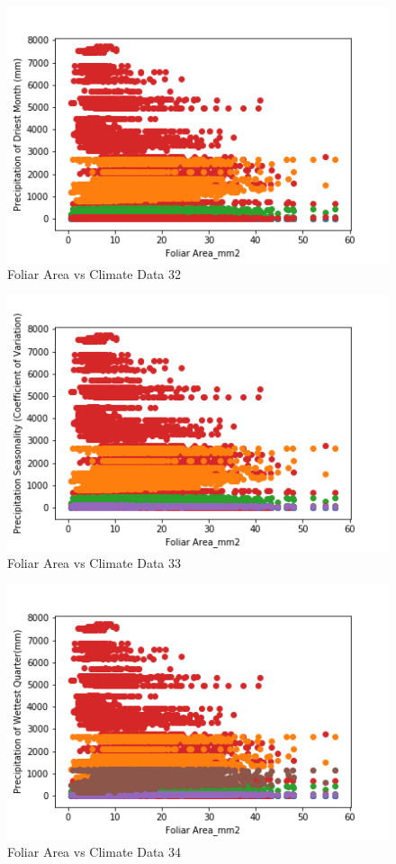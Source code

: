 \documentclass[letterpaper]{article}
\begin{document}
\begin{figure}[h]
\caption{Foliar Area vs Climate Data 32\label{fig:Foliar_Area_vs_32}}
\centering
\includegraphics[width=0.7\paperwidth]{Foliar_Area_vs_32}
\end{figure}


\begin{figure}[h]
\caption{Foliar Area vs Climate Data 33\label{fig:Foliar_Area_vs_33}}
\centering
\includegraphics[width=0.7\paperwidth]{Foliar_Area_vs_33}
\end{figure}


\begin{figure}[h]
\caption{Foliar Area vs Climate Data 34\label{fig:Foliar_Area_vs_34}}
\centering
\includegraphics[width=0.7\paperwidth]{Foliar_Area_vs_34}
\end{figure}
\end{document}
